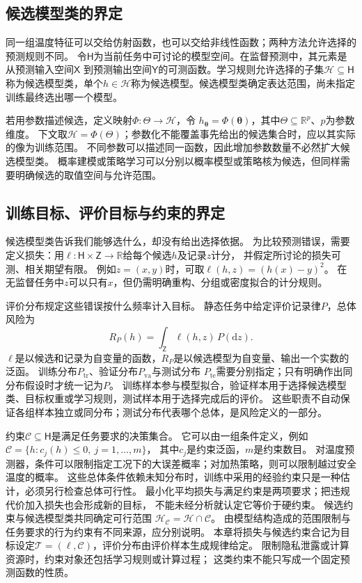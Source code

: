 \subsection{候选模型类的界定}
\label{sec:future-candidate-model-class}

同一组温度特征可以交给仿射函数，也可以交给非线性函数；两种方法允许选择的预测规则不同。
令$\mathsf H$为当前任务中可讨论的模型空间。在监督预测中，其元素是从预测输入空间$\mathsf X$
到预测输出空间$\mathsf Y$的可测函数。学习规则允许选择的子集$\mathcal H\subseteq\mathsf H$
称为候选模型类，单个$h\in\mathcal H$称为候选模型。候选模型类确定表达范围，尚未指定训练最终选出哪一个模型。

若用参数描述候选，定义映射$\Phi:\Theta\to\mathcal H$，令
$h_{\bm\theta}=\Phi(\bm\theta)$，其中$\Theta\subseteq\mathbb R^p$、$p$为参数维度。
下文取$\mathcal H=\Phi(\Theta)$；参数化不能覆盖事先给出的候选集合时，应以其实际的像为训练范围。
不同参数可以描述同一函数，因此增加参数数量不必然扩大候选模型类。
概率建模或策略学习可以分别以概率模型或策略核为候选，但同样需要明确候选的取值空间与允许范围。

\subsection{训练目标、评价目标与约束的界定}
\label{sec:future-learning-goal-objects}

候选模型类告诉我们能够选什么，却没有给出选择依据。
为比较预测错误，需要定义损失：用$\ell:\mathsf H\times\mathsf Z\to\mathbb R$给每个候选$h$及记录$z$计分，
并假定所讨论的损失可测、相关期望有限。
例如$z=(x,y)$时，可取$\ell(h,z)=(h(x)-y)^2$。
在无监督任务中$z$可以只有$x$，但仍需明确重构、分组或密度拟合的计分规则。

评价分布规定这些错误按什么频率计入目标。
静态任务中给定评价记录律$P$，总体风险为
\begin{equation}
  R_P(h)=\int_{\mathsf Z}\ell(h,z)\,P(\mathrm dz).
  \label{eq:future-unified-population-risk}
\end{equation}
$\ell$是以候选和记录为自变量的函数，$R_P$是以候选模型为自变量、输出一个实数的泛函。
训练分布$P_{\mathrm{tr}}$、验证分布$P_{\mathrm{va}}$与测试分布
$P_{\mathrm{te}}$需要分别指定；只有明确作出同分布假设时才统一记为$P$。
训练样本参与模型拟合，验证样本用于选择候选模型类、目标权重或学习规则，测试样本用于选择完成后的评价。
这些职责不自动保证各组样本独立或同分布；测试分布代表哪个总体，是风险定义的一部分。

约束$\mathcal C\subseteq\mathsf H$是满足任务要求的决策集合。
它可以由一组条件定义，例如$\mathcal C=\{h:c_j(h)\leq0,\ j=1,\ldots,m\}$，
其中$c_j$是约束泛函，$m$是约束数目。
对温度预测器，条件可以限制指定工况下的大误差概率；对加热策略，则可以限制越过安全温度的概率。
这些总体条件依赖未知分布时，训练中采用的经验约束只是一种估计，必须另行检查总体可行性。
最小化平均损失与满足约束是两项要求；把违规代价加入损失也会形成新的目标，
不能未经分析就认定它等价于硬约束。
候选约束与候选模型类共同确定可行范围
$\mathcal H_{\mathcal C}=\mathcal H\cap\mathcal C$。
由模型结构造成的范围限制与任务要求的行为约束有不同来源，应分别说明。
本章将损失与候选约束合记为目标设定$\mathcal T=(\ell,\mathcal C)$，评价分布由评价样本生成规律给定。
限制隐私泄露或计算资源时，约束对象还包括学习规则或计算过程；
这类约束不能只写成一个固定预测函数的性质。

